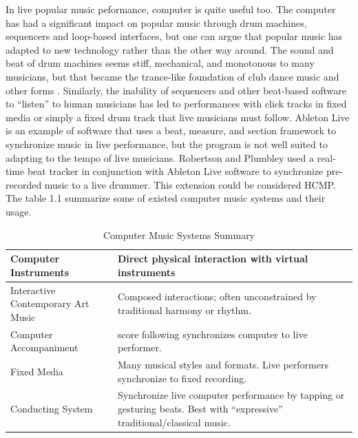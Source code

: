 In live popular music peformance, computer is quite useful too.
The computer has had a significant
impact on popular music through drum machines, sequencers and loop-based
interfaces, but one can argue that popular music has adapted to new technology
rather than the other way around. The sound and beat of drum machines seems stiff,
mechanical, and monotonous to many musicians, but that became the trance-like
foundation of club dance music and other forms . Similarly, 
the inability of
sequencers and other beat-based software to “listen” to human musicians has led to
performances with click tracks in fixed media or simply a fixed drum track that live
musicians must follow. Ableton Live \cite{Ableton:2011} is an example of software that
uses a beat, measure, and section framework to synchronize music in live
performance, but the program is not well suited to adapting to the tempo of live
musicians. Robertson and Plumbley \cite{Robertson:2007} used a real-time beat 
tracker in
conjunction with Ableton Live software to synchronize pre-recorded music 
to a live drummer. This extension could be considered HCMP.
The table 1.1 summarize some of existed computer music systems and their usage.

\begin{table}[htdp]
\centering
\begin{tabular}{| p{5cm} | p{8cm} |} %

\hline
Computer Instruments & Direct physical interaction with virtual instruments \\

\hline 
Interactive Contemporary Art Music & Composed interactions; often unconstrained by
traditional harmony or rhythm.\\

\hline
Computer Accompaniment & score following synchronizes computer to live performer.\\

\hline
Fixed Media  & Many musical styles and formats. Live performers
synchronize to fixed recording.\\

\hline
Conducting System & Synchronize live computer performance by tapping or
gesturing beats. Best with “expressive”
traditional/classical music.\\
\hline
\end{tabular}
\caption[Computer Music Systems Summary]{Computer Music Systems Summary}
\label{latexin_genes} %
\end{table}

